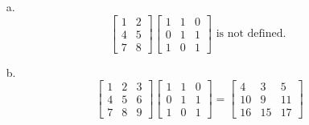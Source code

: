 \documentclass[11pt]{article}
\theoremstyle{definition}
\theoremstyle{plain}
\theoremstyle{remark}
\begin{document}
\begin{enumerate}
\begin{enumerate}
              \item[a.]
                    \[
                        \begin{bmatrix}
                            1 & 2 \\
                            4 & 5 \\
                            7 & 8
                        \end{bmatrix}
                        \begin{bmatrix}
                            1 & 1 & 0 \\
                            0 & 1 & 1 \\
                            1 & 0 & 1
                        \end{bmatrix}
                        \text{ is not defined. }
                    \]

              \item[b.]
                    \[
                        \begin{bmatrix}
                            1 & 2 & 3 \\
                            4 & 5 & 6 \\
                            7 & 8 & 9
                        \end{bmatrix}
                        \begin{bmatrix}
                            1 & 1 & 0 \\
                            0 & 1 & 1 \\
                            1 & 0 & 1
                        \end{bmatrix}
                        =
                        \begin{bmatrix}
                            4  & 3  & 5  \\
                            10 & 9  & 11 \\
                            16 & 15 & 17
                        \end{bmatrix}
                    \]


\end{enumerate}
\end{enumerate}
\end{document}
